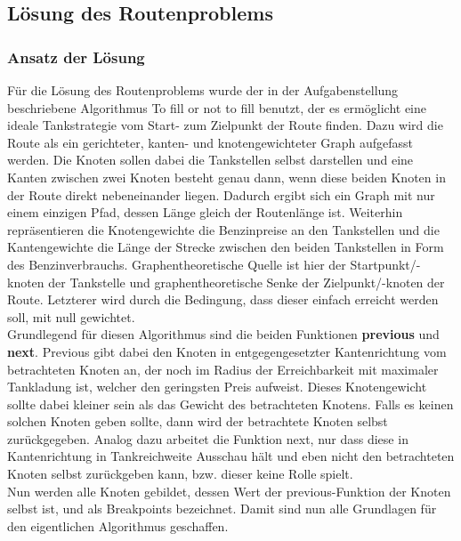 \documentclass[11pt]{article}
\begin{document}
\subsection{Lösung des Routenproblems}
\subsubsection{Ansatz der Lösung}
	Für die Lösung des Routenproblems wurde der in der Aufgabenstellung beschriebene Algorithmus \glqq To fill or not to fill\grqq{}\cite{routefinding} benutzt, der es ermöglicht eine ideale Tankstrategie vom Start- zum Zielpunkt der Route finden. Dazu wird die Route als ein gerichteter, kanten- und knotengewichteter Graph aufgefasst werden. Die Knoten sollen dabei die Tankstellen selbst darstellen und eine Kanten zwischen zwei Knoten besteht genau dann, wenn diese beiden Knoten in der Route direkt nebeneinander liegen. Dadurch ergibt sich ein Graph mit nur einem einzigen Pfad, dessen Länge gleich der Routenlänge ist. Weiterhin repräsentieren die Knotengewichte die Benzinpreise an den Tankstellen und die Kantengewichte die Länge der Strecke zwischen den beiden Tankstellen in Form des Benzinverbrauchs. Graphentheoretische Quelle ist hier der Startpunkt/-knoten der Tankstelle und graphentheoretische Senke der Zielpunkt/-knoten der Route. Letzterer wird durch die Bedingung, dass dieser einfach erreicht werden soll, mit null gewichtet.\\
	Grundlegend für diesen Algorithmus sind die beiden Funktionen \textbf{previous} und \textbf{next}. Previous gibt dabei den Knoten in entgegengesetzter Kantenrichtung vom betrachteten Knoten an, der  noch im Radius der Erreichbarkeit mit maximaler Tankladung ist, welcher den geringsten Preis aufweist. Dieses Knotengewicht sollte dabei kleiner sein als das Gewicht des betrachteten Knotens. Falls es keinen solchen Knoten geben sollte, dann wird der betrachtete Knoten selbst zurückgegeben. Analog dazu arbeitet die Funktion next, nur dass diese in Kantenrichtung in Tankreichweite Ausschau hält und eben nicht den betrachteten Knoten selbst zurückgeben kann, bzw. dieser keine Rolle spielt. \\
	Nun werden alle Knoten gebildet, dessen Wert der previous-Funktion der Knoten selbst ist, und als \glqq Breakpoints\grqq{} bezeichnet. Damit sind nun alle Grundlagen für den eigentlichen Algorithmus geschaffen. \\ \\
\end{document}
